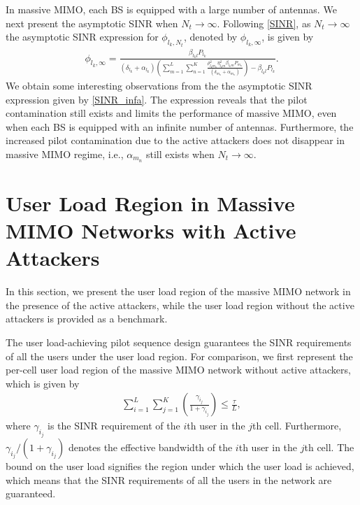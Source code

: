 \documentclass[conference]{IEEEtran}
\begin{document}
In massive MIMO, each BS is equipped with a large number of antennas. We next present the asymptotic SINR when $N_{t}\rightarrow\infty$.  Following \eqref{SINR}, as $N_{t}\rightarrow\infty$ the asymptotic SINR expression for $\phi_{l_{k},N_{t}}$, denoted by $\phi_{l_{k},\infty}$, is given by
\begin{align}\label{SINR_infa}
\phi_{l_{k},\infty}\!=\!\frac{\beta_{l_{k}l}P_{l_{k}}}{\left(\delta_{l_{k}}\!+\!\alpha_{l_{k}}\right)\left(\sum\limits_{m=1}^{L}
\sum\limits_{n=1}^{K}\frac{\rho_{l_{k}m_{n}}^{2}\eta_{l_{k}m}^2\beta_{l_{k}m}P_{m_{n}}}{\left(\delta_{m_{n}}+\alpha_{m_{n}}\right)}\right)\!-\!\beta_{l_{k}l}P_{l_{k}}}. \tag{12}
\end{align}
We obtain some interesting observations from the the asymptotic SINR expression given by \eqref{SINR_infa}. The expression reveals that the pilot contamination still exists and limits the performance of massive MIMO, even when each BS is equipped with an infinite number of antennas. Furthermore, the increased pilot contamination due to the active attackers does not disappear in massive MIMO regime, i.e., $\alpha_{m_{n}}$ still exists when $N_{t}\rightarrow\infty$.

\section{User Load Region in Massive MIMO Networks with Active Attackers}

In this section, we present the user load region of the massive MIMO network in the presence of the active attackers, while the user load region without the active attackers is provided as a benchmark.

The user load-achieving pilot sequence design \cite{Akbar16,Akbar16a} guarantees the SINR requirements of all the users under the user load region. For comparison, we first represent the per-cell user load region of the massive MIMO network without active attackers, which is given by
\begin{align}\label{BW_all}
\sum_{i=1}^{L}\sum_{j=1}^{K}\left(\frac{\gamma_{i_{j}}}{1+\gamma_{i_{j}}}\right)\leq \frac{\tau}{L}, \tag{13}
\end{align}
where $\gamma_{i_{j}}$ is the SINR requirement of the $i$th user in the $j$th cell. Furthermore, ${\gamma_{i_{j}}}/{(1+\gamma_{i_{j}})}$ denotes the effective bandwidth of the $i$th user in the $j$th cell.
The bound on the user load signifies the region under which the user load is achieved, which means that the SINR requirements of all the users in the network  are guaranteed.
\end{document}
